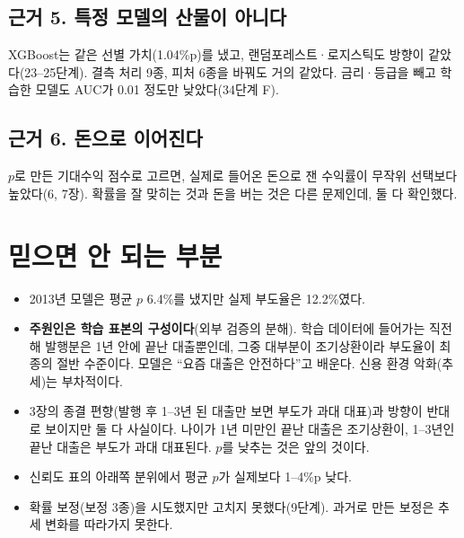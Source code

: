 \subsection*{근거 5. 특정 모델의 산물이 아니다}
XGBoost는 같은 선별 가치(1.04\%p)를 냈고, 랜덤포레스트·\allowbreak{}로지스틱도 방향이 같았다(23--25단계). 결측 처리 9종, 피처 6종을 바꿔도 거의 같았다. 금리·\allowbreak{}등급을 빼고 학습한 모델도 AUC가 0.01 정도만 낮았다(34단계 F).

\subsection*{근거 6. 돈으로 이어진다}
$p$로 만든 기대수익 점수로 고르면, 실제로 들어온 돈으로 잰 수익률이 무작위 선택보다 높았다(6, 7장). 확률을 잘 맞히는 것과 돈을 버는 것은 다른 문제인데, 둘 다 확인했다.

\section{믿으면 안 되는 부분}
\begin{warnbox}
\begin{itemize}[leftmargin=*]
\item 2013년 모델은 평균 $p$ 6.4\%를 냈지만 실제 부도율은 12.2\%였다.
\item \textbf{주원인은 학습 표본의 구성이다}(외부 검증의 분해). 학습 데이터에 들어가는 직전 해 발행분은 1년 안에 끝난 대출뿐인데, 그중 대부분이 조기상환이라 부도율이 최종의 절반 수준이다. 모델은 ``요즘 대출은 안전하다''고 배운다. 신용 환경 악화(추세)는 부차적이다.
\item 3장의 종결 편향(발행 후 1--3년 된 대출만 보면 부도가 과대 대표)과 방향이 반대로 보이지만 둘 다 사실이다. 나이가 1년 미만인 끝난 대출은 조기상환이, 1--3년인 끝난 대출은 부도가 과대 대표된다. $p$를 낮추는 것은 앞의 것이다.
\item 신뢰도 표의 아래쪽 분위에서 평균 $p$가 실제보다 1--4\%p 낮다.
\item 확률 보정(보정 3종)을 시도했지만 고치지 못했다(9단계). 과거로 만든 보정은 추세 변화를 따라가지 못한다.
\end{itemize}
\end{warnbox}

